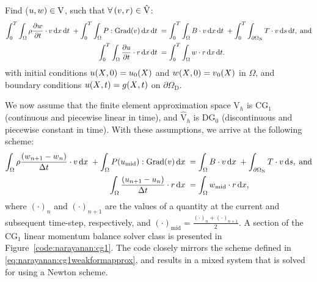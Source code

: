 \noindent Find ($\mbox{$ u$}, \mbox{$ w$}) \in \mathrm{V}$, such that $\forall\, (\mbox{$ v$},
\mbox{$ r$}) \in \hat{\mathrm{V}}$:
\begin{equation}
  \begin{split}
    \int_{0}^{T} \int_{\Omega} \rho \frac{\partial \mbox{$ w$}}{\partial t}
    \cdot \mbox{$ v$} \, \mathrm{d}x \, \mathrm{d}t\; + \int_{0}^{T} \int_{\Omega}
    \mbox{$ P$}:\mathrm{Grad}(\mbox{$ v$}) \, \mathrm{d}x \, \mathrm{d}t\;
    &= \int_{0}^{T} \int_{\Omega} \mbox{$ B$} \cdot \mbox{$ v$} \, \mathrm{d}x \, \mathrm{d}t\; +
    \int_{0}^{T} \int_{\partial\Omega_{\mathrm{N}}} \mbox{$ T$} \cdot \mbox{$ v$} \, \mathrm{d}s
    \, \mathrm{d}t, \; \mathrm{and}\\
    \int_{0}^{T} \int_{\Omega} \frac{\partial \mbox{$ u$}}{\partial t} \cdot
    \mbox{$ r$} \, \mathrm{d}x \, \mathrm{d}t\;
    &= \int_{0}^{T} \int_{\Omega} \mbox{$ w$} \cdot \mbox{$ r$} \, \mathrm{d}x \, \mathrm{d}t.
  \end{split}
\label{eq:narayanan:cg1weakform}
\end{equation}
with initial conditions $\mbox{$ u$}(\mbox{$ X$}, 0) = \mbox{$ u$}_{0}(\mbox{$ X$})$ and $w(\mbox{$ X$}, 0)
= \mbox{$ v$}_{0}(\mbox{$ X$})$ in $\Omega$, and boundary conditions $\mbox{$ u$}(\mbox{$ X$}, t) =
\mbox{$ g$}(\mbox{$ X$}, t)$ on $\partial\Omega_{\mathrm{D}}$.

We now assume that the finite element approximation space
$\mathrm{V}_{h}$ is CG$_{1}$ (continuous and piecewise linear in time),
and $\hat{\mathrm{V}}_{h}$ is DG$_{0}$ (discontinuous and piecewise
constant in time). With these assumptions, we arrive at the following
scheme:
\begin{equation}
  \begin{split}
    \int_{\Omega} \rho \frac{\left(\mbox{$ w$}_{n+1} - \mbox{$ w$}_{n}\right)}{\Delta
      t} \cdot \mbox{$ v$} \, \mathrm{d}x\; + \int_{\Omega}
    \mbox{$ P$}(\mbox{$ u$}_{\mathrm{mid}}):\mathrm{Grad}(\mbox{$ v$}) \, \mathrm{d}x\;
    &=  \int_{\Omega} \mbox{$ B$} \cdot \mbox{$ v$} \, \mathrm{d}x\;
    +  \int_{\partial\Omega_{\mathrm{N}}} \mbox{$ T$} \cdot \mbox{$ v$} \, \mathrm{d}s,
    \; \mathrm{and}\\
    \int_{\Omega} \frac{\left(\mbox{$ u$}_{n+1} - \mbox{$ u$}_{n}\right)}{\Delta t}
    \cdot \mbox{$ r$} \, \mathrm{d}x\;
    &=  \int_{\Omega} \mbox{$ w$}_{\mathrm{mid}} \cdot \mbox{$ r$} \, \mathrm{d}x,
\end{split}
\label{eq:narayanan:cg1weakformapprox}
\end{equation}
where $(\cdot)_{n}$ and $(\cdot)_{n+1}$ are the values of a
quantity at the current and subsequent time-step, respectively, and
$(\cdot)_{\mathrm{mid}} = \frac{(\cdot)_{n} +
  (\cdot)_{n+1}}{2}$. A section of the CG$_{1}$ linear momentum balance
solver class is presented in Figure~\ref{code:narayanan:cg1}. The
code closely mirrors the scheme defined in
\eqref{eq:narayanan:cg1weakformapprox}, and results in a mixed system
that is solved for using a Newton scheme.


